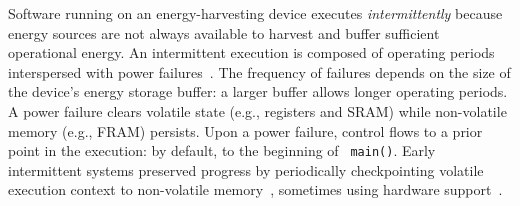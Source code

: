 Software running on an energy-harvesting device executes {\em intermittently}
because energy sources are not always available to harvest and buffer
sufficient operational energy. An intermittent execution is composed of
operating periods interspersed with power
failures~\cite{dino,chain,alpaca,ratchet}. The frequency of failures depends on
the size of the device's energy storage buffer: a larger buffer allows longer
operating periods. 
A power failure clears volatile state (e.g., registers and SRAM) while
non-volatile memory (e.g., FRAM) persists. Upon a power failure, control flows
to a prior point in the execution: by default, to the beginning of {\tt
main()}. Early intermittent systems preserved progress by periodically
checkpointing volatile execution context to non-volatile
memory~\cite{mementos}, sometimes using hardware
support~\cite{mottola2017harvos,hibernusplusplus,hibernus,idetic,quickrecall}. 



